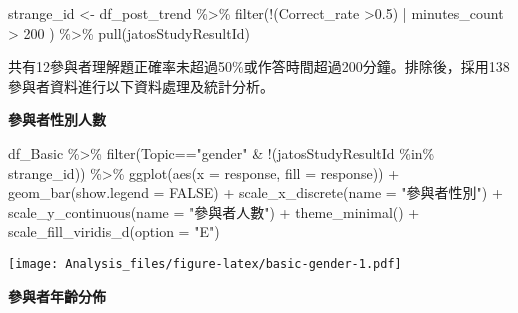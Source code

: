 \documentclass[
]{article}
\newenvironment{Shaded}{\begin{snugshade}}{\end{snugshade}}
\newcommand{\AttributeTok}[1]{\textcolor[rgb]{0.77,0.63,0.00}{#1}}
\newcommand{\ConstantTok}[1]{\textcolor[rgb]{0.00,0.00,0.00}{#1}}
\newcommand{\DecValTok}[1]{\textcolor[rgb]{0.00,0.00,0.81}{#1}}
\newcommand{\FloatTok}[1]{\textcolor[rgb]{0.00,0.00,0.81}{#1}}
\newcommand{\FunctionTok}[1]{\textcolor[rgb]{0.00,0.00,0.00}{#1}}
\newcommand{\NormalTok}[1]{#1}
\newcommand{\OtherTok}[1]{\textcolor[rgb]{0.56,0.35,0.01}{#1}}
\newcommand{\SpecialCharTok}[1]{\textcolor[rgb]{0.00,0.00,0.00}{#1}}
\newcommand{\StringTok}[1]{\textcolor[rgb]{0.31,0.60,0.02}{#1}}
\begin{document}
\begin{Shaded}
\begin{Highlighting}[]
\NormalTok{strange\_id }\OtherTok{\textless{}{-}}\NormalTok{ df\_post\_trend }\SpecialCharTok{\%\textgreater{}\%}
  \FunctionTok{filter}\NormalTok{(}\SpecialCharTok{!}\NormalTok{(Correct\_rate }\SpecialCharTok{\textgreater{}}\FloatTok{0.5}\NormalTok{) }\SpecialCharTok{|}\NormalTok{ minutes\_count }\SpecialCharTok{\textgreater{}} \DecValTok{200}\NormalTok{ ) }\SpecialCharTok{\%\textgreater{}\%}
  \FunctionTok{pull}\NormalTok{(jatosStudyResultId)}
\end{Highlighting}
\end{Shaded}

共有12參與者理解題正確率未超過50\%或作答時間超過200分鐘。排除後，採用138
參與者資料進行以下資料處理及統計分析。

\textbf{參與者性別人數}

\begin{Shaded}
\begin{Highlighting}[]
\NormalTok{df\_Basic }\SpecialCharTok{\%\textgreater{}\%} \FunctionTok{filter}\NormalTok{(Topic}\SpecialCharTok{==}\StringTok{"gender"} \SpecialCharTok{\&} \SpecialCharTok{!}\NormalTok{(jatosStudyResultId }\SpecialCharTok{\%in\%}\NormalTok{ strange\_id)) }\SpecialCharTok{\%\textgreater{}\%}
  \FunctionTok{ggplot}\NormalTok{(}\FunctionTok{aes}\NormalTok{(}\AttributeTok{x =}\NormalTok{ response, }\AttributeTok{fill =}\NormalTok{ response)) }\SpecialCharTok{+}
  \FunctionTok{geom\_bar}\NormalTok{(}\AttributeTok{show.legend =} \ConstantTok{FALSE}\NormalTok{) }\SpecialCharTok{+}
  \FunctionTok{scale\_x\_discrete}\NormalTok{(}\AttributeTok{name =} \StringTok{"參與者性別"}\NormalTok{) }\SpecialCharTok{+}
  \FunctionTok{scale\_y\_continuous}\NormalTok{(}\AttributeTok{name =} \StringTok{"參與者人數"}\NormalTok{) }\SpecialCharTok{+}
  \FunctionTok{theme\_minimal}\NormalTok{() }\SpecialCharTok{+}
  \FunctionTok{scale\_fill\_viridis\_d}\NormalTok{(}\AttributeTok{option =} \StringTok{"E"}\NormalTok{)}
\end{Highlighting}
\end{Shaded}

\texttt{[image: Analysis\_files/figure-latex/basic-gender-1.pdf]}

\textbf{參與者年齡分佈}
\end{document}
